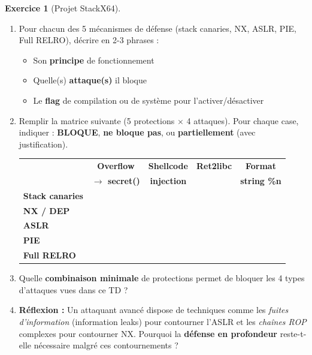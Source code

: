 \documentclass[a4paper,11pt]{article}
\theoremstyle{plain}
\theoremstyle{definition}
\newtheorem{exercice}{Exercice}
\begin{document}
\begin{exercice}[Projet StackX64]
\begin{enumerate}
\item[\textbf{6a)}] Pour chacun des 5 mécanismes de défense (stack canaries, NX, ASLR, PIE, Full RELRO), décrire en 2-3 phrases :
\begin{itemize}
    \item Son \textbf{principe} de fonctionnement
    \item Quelle(s) \textbf{attaque(s)} il bloque
    \item Le \textbf{flag} de compilation ou de système pour l'activer/désactiver
\end{itemize}

\item[\textbf{6b)}] Remplir la matrice suivante (5 protections $\times$ 4 attaques). Pour chaque case, indiquer : \textbf{BLOQUE}, \textbf{ne bloque pas}, ou \textbf{partiellement} (avec justification).

\begin{center}
\begin{tabular}{l|c|c|c|c}
\toprule
& \textbf{Overflow} & \textbf{Shellcode} & \textbf{Ret2libc} & \textbf{Format} \\
& \textbf{$\to$ secret()} & \textbf{injection} & & \textbf{string \%n} \\
\midrule
\textbf{Stack canaries} & & & & \\
\midrule
\textbf{NX / DEP} & & & & \\
\midrule
\textbf{ASLR} & & & & \\
\midrule
\textbf{PIE} & & & & \\
\midrule
\textbf{Full RELRO} & & & & \\
\bottomrule
\end{tabular}
\end{center}

\item[\textbf{6c)}] Quelle \textbf{combinaison minimale} de protections permet de bloquer les 4 types d'attaques vues dans ce TD ?

\item[\textbf{6d)}] \textbf{Réflexion :} Un attaquant avancé dispose de techniques comme les \textit{fuites d'information} (information leaks) pour contourner l'ASLR et les \textit{chaînes ROP} complexes pour contourner NX. Pourquoi la \textbf{défense en profondeur} reste-t-elle nécessaire malgré ces contournements ?
\end{enumerate}

\begin{correction}


\end{correction}
\end{exercice}
\end{document}
